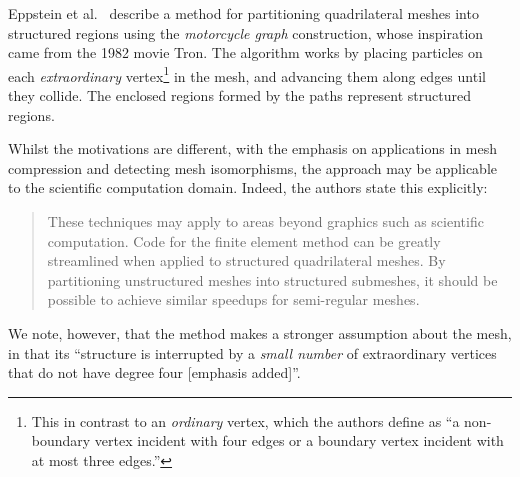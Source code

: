 


Eppstein et al.~\cite{eppstein2008motorcycle} describe a method for partitioning quadrilateral meshes into structured regions using the \emph{motorcycle graph} construction, whose inspiration came from the 1982 movie Tron. The algorithm works by placing particles on each \emph{extraordinary} vertex\footnote{\label{footnote:extraordinary-vertices} This in contrast to an \emph{ordinary} vertex, which the authors define as ``a non-boundary vertex incident with four edges or a boundary vertex incident with at most three edges.''} in the mesh, and advancing them along edges until they collide. The enclosed regions formed by the paths represent structured regions.

Whilst the motivations are different, with the emphasis on applications in mesh compression and detecting mesh isomorphisms, the approach may be applicable to the scientific computation domain. Indeed, the authors state this explicitly:
\begin{quote}
These techniques may apply to areas beyond graphics such as scientific computation. Code for the finite element method can be greatly streamlined when applied to structured quadrilateral meshes. By partitioning unstructured meshes into structured submeshes, it should be possible to achieve similar speedups for semi-regular meshes.
\end{quote}

We note, however, that the method makes a stronger assumption about the mesh, in that its ``structure is interrupted by a \emph{small number} of extraordinary vertices that do not have degree four [emphasis added]''.



